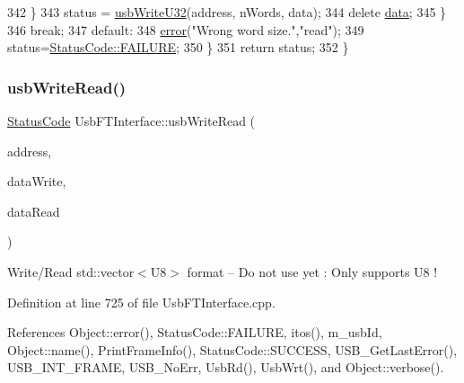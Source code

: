 \begin{DoxyCode}
342       \}
343       status = \hyperlink{classUsbFTInterface_ac5eac42e444c9b0f19f0f70598c51b20}{usbWriteU32}(address, nWords, data);
344       \textcolor{keyword}{delete} \hyperlink{namespaceshell_a5ea2525995cedc3efd69ea8a7f034d1e}{data};
345     \}
346     \textcolor{keywordflow}{break};
347   \textcolor{keywordflow}{default}:
348     \hyperlink{classObject_a204a95f57818c0f811933917a30eff45}{error}(\textcolor{stringliteral}{"Wrong word size."},\textcolor{stringliteral}{"read"});
349     status=\hyperlink{classStatusCode_a6f565cbeadc76d14c72f047e5e85eb4ba3da73d4c469762eb9d3c960368252b26}{StatusCode::FAILURE};
350   \}
351   \textcolor{keywordflow}{return} status;
352 \}
\end{DoxyCode}
\mbox{\label{classUsbFTInterface_aa477927996bd05aeee185c192ef9a68e}} 
\subsubsection{\texorpdfstring{usb\+Write\+Read()}{usbWriteRead()}}
{\footnotesize\ttfamily \hyperlink{classStatusCode}{Status\+Code} Usb\+F\+T\+Interface\+::usb\+Write\+Read (\begin{DoxyParamCaption}\item[{unsigned long int}]{address,  }\item[{std\+::vector$<$ \hyperlink{classUsbFTInterface_a3b007566f8af758984d97ada2b9938d3}{U8} $>$}]{data\+Write,  }\item[{std\+::vector$<$ \hyperlink{classUsbFTInterface_a3b007566f8af758984d97ada2b9938d3}{U8} $>$ \&}]{data\+Read }\end{DoxyParamCaption})}

Write/\+Read std\+::vector$<$\+U8$>$ format -- Do not use yet \+: Only supports U8 ! 

Definition at line 725 of file Usb\+F\+T\+Interface.\+cpp.



References Object\+::error(), Status\+Code\+::\+F\+A\+I\+L\+U\+RE, itos(), m\+\_\+usb\+Id, Object\+::name(), Print\+Frame\+Info(), Status\+Code\+::\+S\+U\+C\+C\+E\+SS, U\+S\+B\+\_\+\+Get\+Last\+Error(), U\+S\+B\+\_\+\+I\+N\+T\+\_\+\+F\+R\+A\+ME, U\+S\+B\+\_\+\+No\+Err, Usb\+Rd(), Usb\+Wrt(), and Object\+::verbose().




